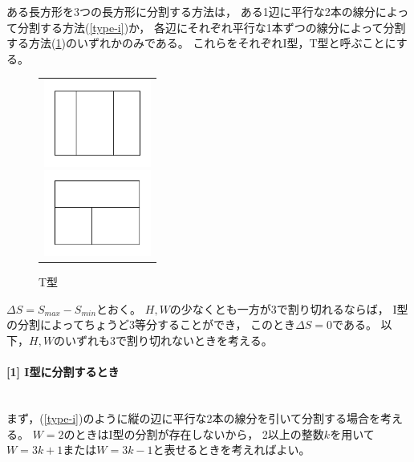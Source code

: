 \documentclass{article}
\newcommand{\myparagraph}[1]{\paragraph{#1}\mbox{}\\}
\begin{document}
ある長方形を3つの長方形に分割する方法は，
ある1辺に平行な2本の線分によって分割する方法(\cref{type-i})か，
各辺にそれぞれ平行な1本ずつの線分によって分割する方法(\cref{type-t})のいずれかのみである。
これらをそれぞれI型，T型と呼ぶことにする。

\begin{figure}[h]
    \begin{center}
        \begin{tabular}{c}
            \begin{minipage}{0.33\hsize}
                \begin{center}
                    \includegraphics[width=100pt]{type-i.png}
                    \caption{I型}
                    \label{type-i}
                \end{center}
            \end{minipage}

            \begin{minipage}{0.33\hsize}
                \begin{center}
                    \includegraphics[width=100pt]{type-t.png}
                    \caption{T型}
                    \label{type-t}
                \end{center}
            \end{minipage}
        \end{tabular}
    \end{center}
\end{figure}

$\Delta S = S_{max} - S_{min}$とおく。
$H, W$の少なくとも一方が3で割り切れるならば，
I型の分割によってちょうど3等分することができ，
このとき$\Delta S = 0$である。
以下，$H, W$のいずれも3で割り切れないときを考える。

\myparagraph{[1] I型に分割するとき}

まず，(\cref{type-i})のように縦の辺に平行な2本の線分を引いて分割する場合を考える。
$W = 2$のときはI型の分割が存在しないから，
2以上の整数$k$を用いて$W = 3k + 1$または$W = 3k - 1$と表せるときを考えればよい。
\end{document}
